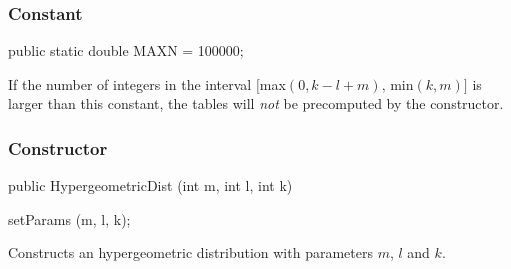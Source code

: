 \unmoved\begin{detailed}
\subsubsection*{Constant}
\begin{code}

   public static double MAXN = 100000;
\end{code}
 \begin{tabb}
  If the number of integers in the interval $[$max$(0,k-l+m),\,$min$(k,m)]$
  is larger than this constant, the tables will {\em not\/}
  be precomputed by the constructor.
\end{tabb}
\end{detailed}

\subsubsection*{Constructor}
\begin{code}

   public HypergeometricDist (int m, int l, int k)\begin{hide} {
      setParams (m, l, k);
   }\end{hide}
\end{code}
  \begin{tabb} Constructs an hypergeometric distribution with parameters
   $m$, $l$ and $k$.
 \end{tabb}

